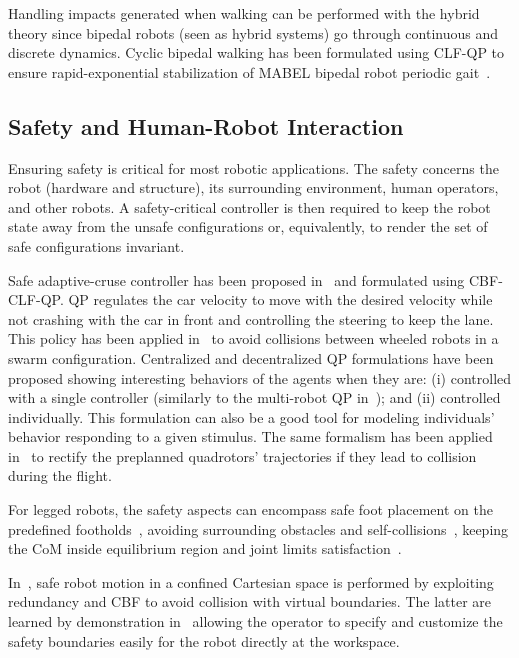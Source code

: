 Handling impacts generated when walking can be performed with the hybrid theory since bipedal robots (seen as hybrid systems) go through continuous and discrete dynamics. Cyclic bipedal walking has been formulated using CLF-QP to ensure rapid-exponential stabilization of MABEL bipedal robot periodic gait~\cite{ames2012cdc,ames2014tac}.

\subsection{Safety and Human-Robot Interaction}
Ensuring safety is critical for most robotic applications. The safety concerns the robot (hardware and structure), its surrounding environment, human operators, and other robots. A safety-critical controller is then required to keep the robot state away from the unsafe configurations or, equivalently, to render the set of safe configurations invariant.%

Safe adaptive-cruse controller has been proposed in~\cite{xu2017ccta,ames2014cdc,ames2017tac} and formulated using CBF-CLF-QP. QP regulates the car velocity to move with the desired velocity while not crashing with the car in front and controlling the steering to keep the lane. This policy has been applied  in~\cite{wang2017tro} to avoid collisions between wheeled robots in a swarm configuration. Centralized and decentralized QP formulations have been proposed showing interesting behaviors of the agents when they are: (i) controlled with a single controller (similarly to the multi-robot QP in~\cite{bouyarmane2019tro}); and (ii) controlled individually. This formulation can also be a good tool for modeling individuals' behavior  responding to a given stimulus. The same formalism has been applied in~\cite{wang2017icra} to rectify the preplanned quadrotors' trajectories if they lead to collision during the flight. 

For legged robots, the safety aspects can encompass safe foot placement on the predefined footholds~\cite{nguyen2016cdc,nguyen2016acc2,grandia2021icra}, avoiding surrounding obstacles and self-collisions~\cite{molnar2022ral,vaillant2016trvcg,quiroz-omana2019ral}, keeping the CoM inside equilibrium region and joint limits satisfaction~\cite{djeha2020ral}. 

In~\cite{rauscher2016iros,murtaza2022ral}, safe robot motion in a confined Cartesian space is performed by exploiting redundancy and CBF to avoid collision with virtual boundaries. The latter are learned by demonstration in~\cite{saveriano2019iros} allowing the operator to specify and customize the safety boundaries easily for the robot directly at the workspace.

